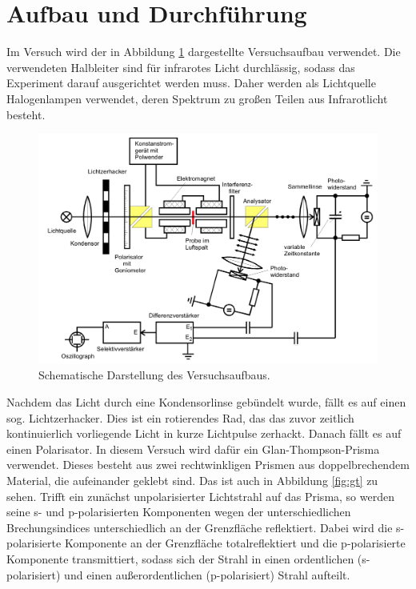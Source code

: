 \section{Aufbau und Durchführung}
\label{sec:aufbauUndDurchfuehrung}

Im Versuch wird der in Abbildung \ref{fig:aufbau} dargestellte Versuchsaufbau verwendet.
Die verwendeten Halbleiter sind für infrarotes Licht durchlässig, sodass das Experiment
darauf ausgerichtet werden muss. Daher werden als Lichtquelle Halogenlampen verwendet,
deren Spektrum zu großen Teilen aus Infrarotlicht besteht.

\begin{figure}
  \centering
  \includegraphics[width=\textwidth]{data/aufbau.png}
  \caption{Schematische Darstellung des Versuchsaufbaus. \cite{anleitung}}
  \label{fig:aufbau}
\end{figure}

Nachdem das Licht durch eine Kondensorlinse gebündelt wurde, fällt es auf einen
sog. Lichtzerhacker. Dies ist ein rotierendes Rad, das das zuvor zeitlich kontinuierlich
vorliegende Licht in kurze Lichtpulse zerhackt. Danach fällt es auf einen Polarisator.
In diesem Versuch wird dafür ein Glan-Thompson-Prisma verwendet. Dieses besteht aus
zwei rechtwinkligen Prismen aus doppelbrechendem Material, die aufeinander geklebt sind.
Das ist auch in Abbildung \ref{fig:gt} zu sehen. Trifft ein zunächst unpolarisierter
Lichtstrahl auf das Prisma, so werden seine s- und p-polarisierten Komponenten wegen der
unterschiedlichen Brechungsindices unterschiedlich an der Grenzfläche reflektiert.
Dabei wird die s-polarisierte Komponente an der Grenzfläche totalreflektiert und die
p-polarisierte Komponente transmittiert, sodass sich der Strahl in einen ordentlichen (s-polarisiert)
und einen außerordentlichen (p-polarisiert) Strahl aufteilt.

